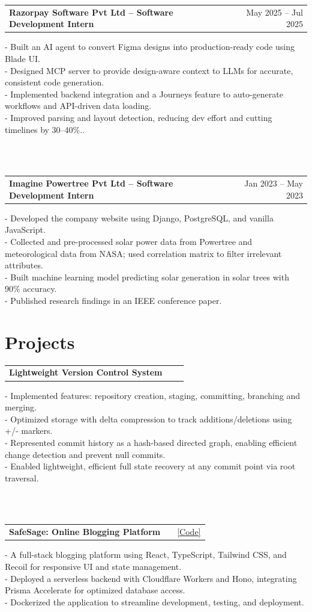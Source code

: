 \documentclass[a4paper,12pt]{article}
\makeatletter
\newenvironment{jobshort}[2]
    {
    \begin{tabularx}{\linewidth}{@{}l X r@{}}
    \textbf{#1} & \hfill &  #2 \\[3.75pt]
    \end{tabularx}
    }
    {
    }
\makeatother
\begin{document}
\begin{jobshort}{Razorpay Software Pvt Ltd – Software Development Intern}{May 2025 -- Jul 2025}
- Built an AI agent to convert Figma designs into production-ready code using Blade UI.\\
- Designed MCP server to provide design-aware context to LLMs for accurate, consistent code generation.\\
- Implemented backend integration and a Journeys feature to auto-generate workflows and API-driven data loading.\\
- Improved parsing and layout detection, reducing dev effort and cutting timelines by 30–40\%..
\end{jobshort}
\\ \\
\begin{jobshort}{Imagine Powertree Pvt Ltd – Software Development Intern}{Jan 2023 -- May 2023}
- Developed the company website using Django, PostgreSQL, and vanilla JavaScript.\\
- Collected and pre-processed solar power data from Powertree and meteorological data from NASA; used correlation matrix to filter irrelevant attributes.\\
- Built machine learning model predicting solar generation in solar trees with 90\% accuracy.\\
- Published research findings in an IEEE conference paper.
\end{jobshort}

\section{Projects}
\begin{jobshort}{Lightweight Version Control System}{}
- Implemented features: repository creation, staging, committing, branching and merging. \\
- Optimized storage with delta compression to track additions/deletions using +/- markers.  \\
- Represented commit history as a hash-based directed graph, enabling efficient change detection and prevent null commits.\\
- Enabled lightweight, efficient full state recovery at any commit point via root traversal.
\end{jobshort}
\\ \\
\begin{jobshort}{SafeSage: Online Blogging Platform}{\href{https://github.com/vidit-od/SafeSage}{[Code]}}
- A full-stack blogging platform using React, TypeScript, Tailwind CSS, and Recoil for responsive UI and state management.\\
- Deployed a serverless backend with Cloudflare Workers and Hono, integrating Prisma Accelerate for optimized database access.\\
- Dockerized the application to streamline development, testing, and deployment.
\end{jobshort}
\end{document}
